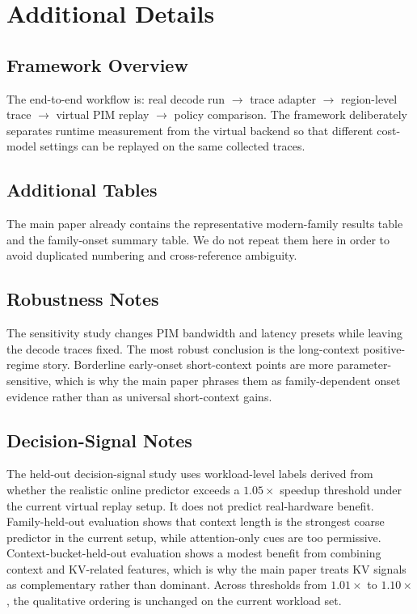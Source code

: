 \section{Additional Details}

\subsection{Framework Overview}

The end-to-end workflow is: real decode run $\rightarrow$ trace adapter $\rightarrow$ region-level trace $\rightarrow$ virtual PIM replay $\rightarrow$ policy comparison. The framework deliberately separates runtime measurement from the virtual backend so that different cost-model settings can be replayed on the same collected traces.

\subsection{Additional Tables}

The main paper already contains the representative modern-family results table and the family-onset summary table. We do not repeat them here in order to avoid duplicated numbering and cross-reference ambiguity.




\subsection{Robustness Notes}

The sensitivity study changes PIM bandwidth and latency presets while leaving the decode traces fixed. The most robust conclusion is the long-context positive-regime story. Borderline early-onset short-context points are more parameter-sensitive, which is why the main paper phrases them as family-dependent onset evidence rather than as universal short-context gains.

\subsection{Decision-Signal Notes}

The held-out decision-signal study uses workload-level labels derived from whether the realistic online predictor exceeds a $1.05\times$ speedup threshold under the current virtual replay setup. It does not predict real-hardware benefit. Family-held-out evaluation shows that context length is the strongest coarse predictor in the current setup, while attention-only cues are too permissive. Context-bucket-held-out evaluation shows a modest benefit from combining context and KV-related features, which is why the main paper treats KV signals as complementary rather than dominant. Across thresholds from $1.01\times$ to $1.10\times$, the qualitative ordering is unchanged on the current workload set.

